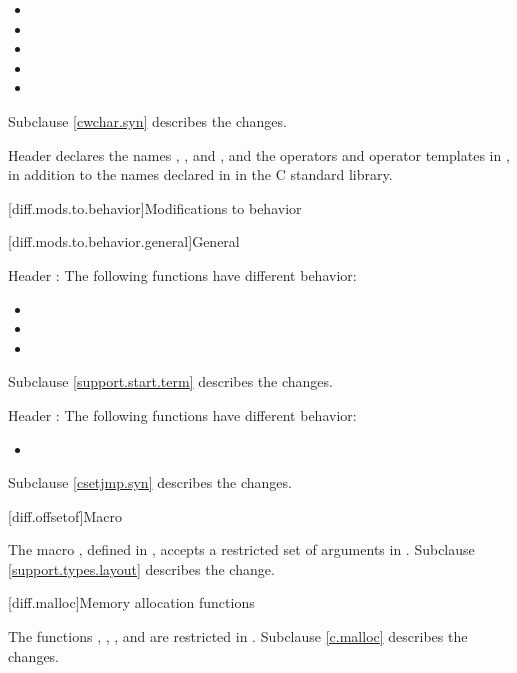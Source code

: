 \begin{itemize}
\item {}
\item {}
\item {}
\item {}
\item {}
\end{itemize}

Subclause \ref{cwchar.syn} describes the changes.

\pnum
Header 
declares the names , , and ,
and the operators and operator templates in ,
in addition to the names declared in
 in the C standard library.

[diff.mods.to.behavior]{Modifications to behavior}

[diff.mods.to.behavior.general]{General}

\pnum
Header :
The following functions have different behavior:

\begin{itemize}
\item {}
\item {}
\item {}
\end{itemize}

Subclause \ref{support.start.term} describes the changes.

\pnum
Header :
The following functions have different behavior:
\begin{itemize}
\item {}
\end{itemize}

Subclause \ref{csetjmp.syn} describes the changes.

[diff.offsetof]{Macro }
%

\pnum
The macro , defined in
,
accepts a restricted set of  arguments in \Cpp{}.
Subclause \ref{support.types.layout} describes the change.

[diff.malloc]{Memory allocation functions}

\pnum
The functions
,
,
,
and
are restricted in \Cpp{}.
Subclause \ref{c.malloc} describes the changes.
